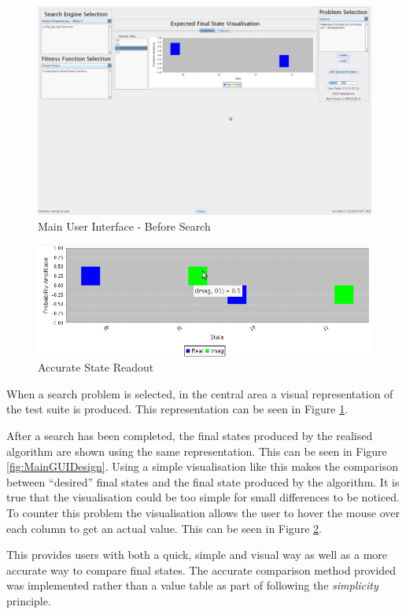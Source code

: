 \begin{figure}
 \includegraphics[width=\textwidth]{GUIDesignProgress.png}
\caption{Main User Interface - Before Search}
\label{fig:MainGUIDesignProg}
\end{figure}
\begin{figure}
 \includegraphics[width=\textwidth]{AccurateReadOutMouseOver.png}
\caption{Accurate State Readout}
\label{fig:AccStateReadOut}
\end{figure}
When a search problem is selected, in the central area a visual representation of the test suite is produced.
This representation can be seen in Figure \ref{fig:MainGUIDesignProg}.

After a search has been completed, the final states produced by the realised algorithm are shown using the same representation.
This can be seen in Figure \ref{fig:MainGUIDesign}.
Using a simple visualisation like this makes the comparison between ``desired'' final states and the final state produced by the algorithm.
It is true that the visualisation could be too simple for small differences to be noticed.
To counter this problem the visualisation allows the user to hover the mouse over each column to get an actual value.
This can be seen in Figure \ref{fig:AccStateReadOut}.

This provides users with both a quick, simple and visual way as well as a more accurate way to compare final states.
The accurate comparison method provided was implemented rather than a value table as part of following the \emph{simplicity} principle.

